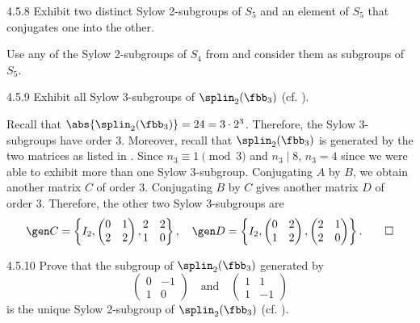 \begin{exercise}{4.5.8}
	Exhibit two distinct Sylow 2-subgroups of $S_5$ and an element of $S_5$ that conjugates one into the other.
\end{exercise}

\begin{sol}
	Use any of the Sylow 2-subgroups of $S_4$ from  and consider them as subgroups of $S_5$.
\end{sol}

\begin{exercise}{4.5.9}
	Exhibit all Sylow 3-subgroups of $\splin_2(\fbb_3)$ (cf. ).
\end{exercise}

\begin{sol}
	Recall that $\abs{\splin_2(\fbb_3)} = 24 = 3 \cdot 2^3$.
	Therefore, the Sylow 3-subgroups have order 3.
	Moreover, recall that $\splin_2(\fbb_3)$ is generated by the two matrices as listed in .
	Since $n_3 \equiv 1 \pmod 3$ and $n_3 \mid 8$, $n_3 = 4$ since we were able to exhibit more than one Sylow 3-subgroup.
	Conjugating $A$ by $B$, we obtain another matrix $C$ of order 3.
	Conjugating $B$ by $C$ gives another matrix $D$ of order 3.
	Therefore, the other two Sylow 3-subgroups are 
	\[
		\gen C = \left\{I_2, 
		\begin{pmatrix}
			0 & 1 \\
			2 & 2
		\end{pmatrix}, 
		\begin{matrix}
			2 & 2 \\
			1 & 0
		\end{matrix} \right\}, \quad
		\gen D = \left\{I_2,
		\begin{pmatrix}
			0 & 2 \\
			1 & 2
		\end{pmatrix}, 
		\begin{pmatrix}
			2 & 1 \\
			2 & 0
		\end{pmatrix} \right\}. \qedhere
	\]
\end{sol}

\begin{exercise}{4.5.10}
	Prove that the subgroup of $\splin_2(\fbb_3)$ generated by
	\[
		\begin{pmatrix}
			0 & -1 \\
			1 & 0
		\end{pmatrix} \quad \text{and} \quad
		\begin{pmatrix}
			1 & 1 \\
			1 & -1
		\end{pmatrix}
	\]
	is the unique Sylow 2-subgroup of $\splin_2(\fbb_3)$ (cf. ).
\end{exercise}

